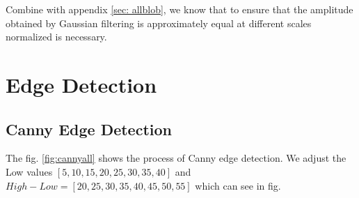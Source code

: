 \documentclass[final]{cvpr}
\begin{document}
Combine with appendix \ref{sec: allblob}, we know that to ensure that the amplitude obtained by Gaussian filtering is approximately equal at different scales normalized is necessary.  


\clearpage

\onecolumn

\begin{appendices}\label{append}

\section{Edge Detection}\label{sec: allcanny}
\subsection{Canny Edge Detection}
The fig. \ref{fig:cannyall} shows the process of Canny edge detection. We adjust the Low values $[5,10,15,20,25,30,35,40]$ and $High-Low=[20,25,30,35,40,45,50,55]$ which can see in fig. 
\begin{figure}[h]
  \centering
  \quad
  \quad
  \quad
\end{figure}
\end{appendices}
\end{document}
